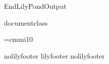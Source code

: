 %
\def\ifundefined#1{\expandafter\ifx\csname#1\endcsname\relax}
%
\def\SkipLilydefs{\endinput}
\ifundefined{EndLilyPondOutput}
        \def\EndLilyPondOutput{\csname bye\endcsname}
        \def\SkipLilydefs{}
\fi
\SkipLilydefs

\ifundefined{documentclass}
        
\else
        
\fi


%
\def\botalign#1{\vbox to 0pt{\vss #1}}
\def\leftalign#1{\hbox to 0pt{#1\hss}}
\font\textmusic=cmmi10
\def\textsharp{\raise.4ex\hbox{\textmusic\char"5D}}
\def\textnatural{\raise.4ex\hbox{\textmusic\char"5C}}
\def\textflat{\raise.2ex\hbox{\textmusic\char"5B}}




\def\interscoreline{\vskip 16pt}
\def\placebox#1#2#3{%
        \botalign{\hbox{\raise #1\leftalign{\kern #2{}#3}}}}%

\def\EndLilyPondOutput{%
  \csname bye\endcsname
}
\def\postheader{}


\ifx\csname nolilyfooter\endcsname\relax
        \csname lilyfooter\texsuffix\endcsname%
\else
        \csname%
        nolilyfooter\texsuffix\endcsname
\fi



\endinput
